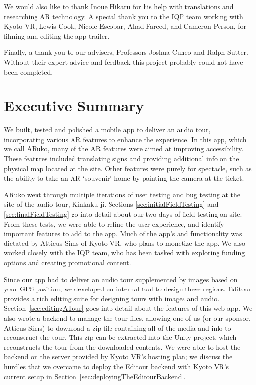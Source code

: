 \documentclass[a4paper, 10pt, american, titlepage]{article}
\begin{document}
We would also like to thank Inoue Hikaru for his help with translations and
researching AR technology. A special thank you to the IQP team working with
Kyoto VR, Lewis Cook, Nicole Escobar, Ahad Fareed, and Cameron Person, for
filming and editing the app trailer.

Finally, a thank you to our advisers, Professors Joshua Cuneo and Ralph Sutter.
Without their expert advice and feedback this project probably could not have
been completed.

\clearpage

\section*{Executive Summary}
\label{sec:executiveSummary}

We built, tested and polished a mobile app to deliver an audio tour,
incorporating various AR features to enhance the experience. In this app, which
we call ARuko, many of the AR features were aimed at improving accessibility.
These features included translating signs and providing additional info on the
physical map located at the site. Other features were purely for spectacle,
such as the ability to take an AR `souvenir' home by pointing the camera at the
ticket.

ARuko went through multiple iterations of user testing and bug testing at the
site of the audio tour, Kinkaku-ji. Sections \ref{sec:initialFieldTesting} and
\ref{sec:finalFieldTesting} go into detail about our two days of field testing
on-site. From these tests, we were able to refine the user experience, and
identify important features to add to the app. Much of the app's and
functionality was dictated by Atticus Sims of Kyoto VR, who plans to monetize
the app. We also worked closely with the IQP team, who has been tasked with
exploring funding options and creating promotional content.

Since our app had to deliver an audio tour supplemented by images based on your
GPS position, we developed an internal tool to design these regions. Editour
provides a rich editing suite for designing tours with images and audio.
Section~\ref{sec:editingATour} goes into detail about the features of this web
app. We also wrote a backend to manage the tour files, allowing one of us (or
our sponsor, Atticus Sims) to download a zip file containing all of the media
and info to reconstruct the tour. This zip can be extracted into the Unity
project, which reconstructs the tour from the downloaded contents. We were able
to host the backend on the server provided by Kyoto VR's hosting plan; we
discuss the hurdles that we overcame to deploy the Editour backend with Kyoto
VR's current setup in Section~\ref{sec:deployingTheEditourBackend}.
\end{document}

